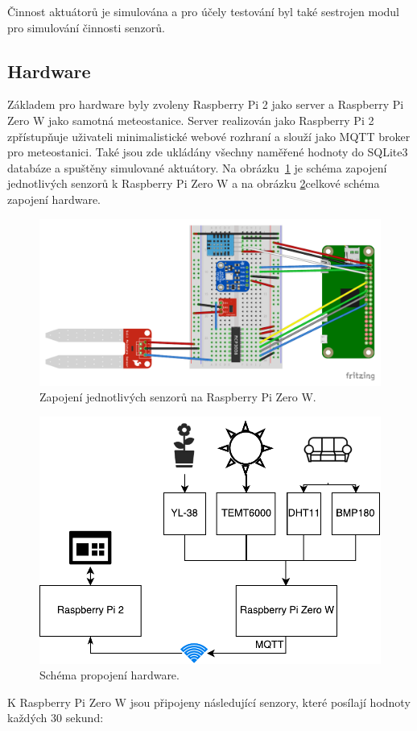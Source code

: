 \documentclass[11pt,a4paper]{article}
\begin{document}
Činnost aktuátorů je simulována a pro účely testování byl také sestrojen modul pro simulování činnosti senzorů.

\subsection{Hardware}\label{subsec:hw}
Základem pro hardware byly zvoleny Raspberry Pi 2 jako server a Raspberry Pi Zero W jako samotná meteostanice. Server realizován jako Raspberry Pi 2 zpřístupňuje uživateli minimalistické webové rozhraní a slouží jako MQTT broker pro meteostanici. Také jsou zde ukládány všechny naměřené hodnoty do SQLite3 databáze a spuštěny simulované aktuátory.
Na obrázku~\ref{fig:hw-scheme-bb} je schéma zapojení jednotlivých senzorů k Raspberry Pi Zero W a na obrázku \ref{fig:hw-scheme}celkové schéma zapojení hardware.

\begin{figure}[htb]
    \centering
    \includegraphics[width=0.75\linewidth]{weather-station_bb}
    \caption{Zapojení jednotlivých senzorů na Raspberry Pi Zero W.}
    \label{fig:hw-scheme-bb}
\end{figure}

\begin{figure}[htb]
    \centering
    \includegraphics[width=0.5\linewidth]{weather-station-scheme}
    \caption{Schéma propojení hardware.}
    \label{fig:hw-scheme}
\end{figure}
K Raspberry Pi Zero W jsou připojeny následující senzory, které posílají hodnoty každých 30 sekund:
\end{document}
